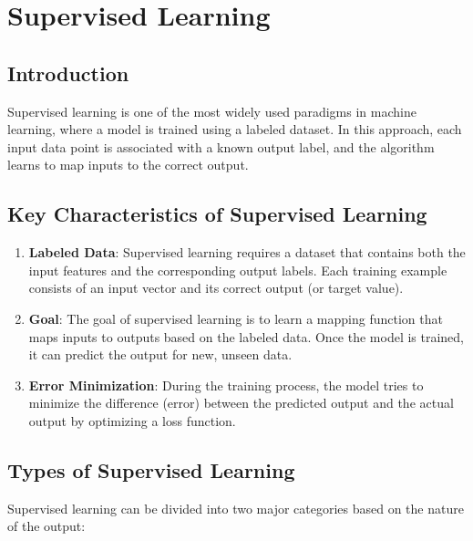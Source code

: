 \section{Supervised Learning}

\subsection*{Introduction}

Supervised learning is one of the most widely used paradigms in machine learning, where a model is trained using a labeled dataset. In this approach, each input data point is associated with a known output label, and the algorithm learns to map inputs to the correct output.

\subsection*{Key Characteristics of Supervised Learning}

\begin{enumerate}
    \item \textbf{Labeled Data}:
    Supervised learning requires a dataset that contains both the input features and the corresponding output labels. Each training example consists of an input vector and its correct output (or target value).
    \item \textbf{Goal}:
    The goal of supervised learning is to learn a mapping function that maps inputs to outputs based on the labeled data. Once the model is trained, it can predict the output for new, unseen data.
    \item \textbf{Error Minimization}:
    During the training process, the model tries to minimize the difference (error) between the predicted output and the actual output by optimizing a loss function.
\end{enumerate}

\subsection*{Types of Supervised Learning}

Supervised learning can be divided into two major categories based on the nature of the output:

